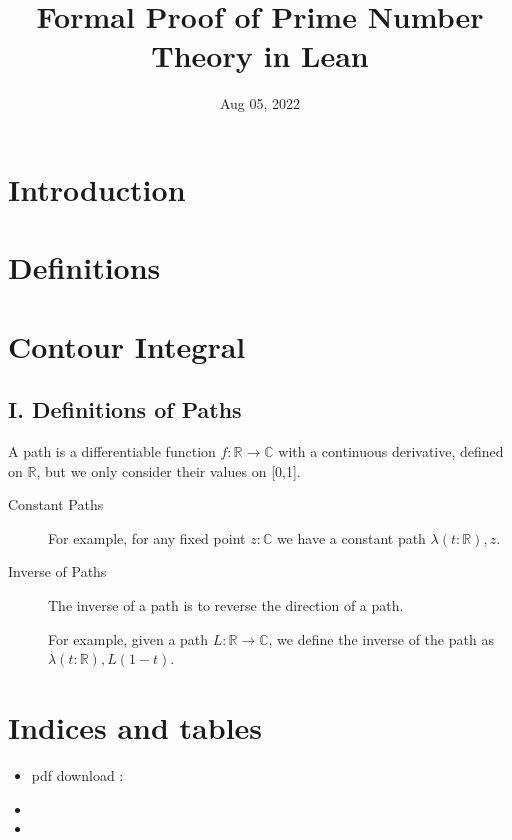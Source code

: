 \documentclass[letterpaper,10pt,english]{sphinxmanual}
\title{Formal Proof of Prime Number Theory in Lean}
\date{Aug 05, 2022}
\author{}
\begin{document}
\pagestyle{empty}
\sphinxmaketitle
\pagestyle{plain}
\sphinxtableofcontents
\pagestyle{normal}
\label{\detokenize{index::doc}}



\chapter{Introduction}
\label{\detokenize{Blueprint/Introduction:introduction}}\label{\detokenize{Blueprint/Introduction::doc}}

\chapter{Definitions}
\label{\detokenize{Blueprint/Definitions:definitions}}\label{\detokenize{Blueprint/Definitions::doc}}

\chapter{Contour Integral}
\label{\detokenize{Blueprint/Contour_Integral:contour-integral}}\label{\detokenize{Blueprint/Contour_Integral::doc}}

\section{I. Definitions of Paths}
\label{\detokenize{Blueprint/Contour_Integral:i-definitions-of-paths}}
\sphinxAtStartPar
A path is a differentiable function \(f : \mathbb{R}\to \mathbb{C}\) with a continuous derivative, defined on \(\mathbb{R}\), but we only consider their values on {[}0,1{]}.
\begin{description}
\item[{Constant Paths}] \leavevmode
\sphinxAtStartPar
For example, for any fixed point \(z : \mathbb{C}\) we have a constant path \(\lambda (t : \mathbb{R}), z\).

\item[{Inverse of Paths}] \leavevmode
\sphinxAtStartPar
The inverse of a path is to reverse the direction of a path.

\sphinxAtStartPar
For example, given a path \(L: \mathbb{R}\to \mathbb{C}\), we define the inverse of the path as \(\lambda (t:\mathbb{R}), L(1-t)\).

\end{description}


\chapter{Indices and tables}
\label{\detokenize{index:indices-and-tables}}\begin{itemize}
\item {} 
\sphinxAtStartPar
pdf download : 

\item {} 
\sphinxAtStartPar
{}

\item {} 
\sphinxAtStartPar
{}

\end{itemize}



\renewcommand{\indexname}{Index}
\printindex
\end{document}
